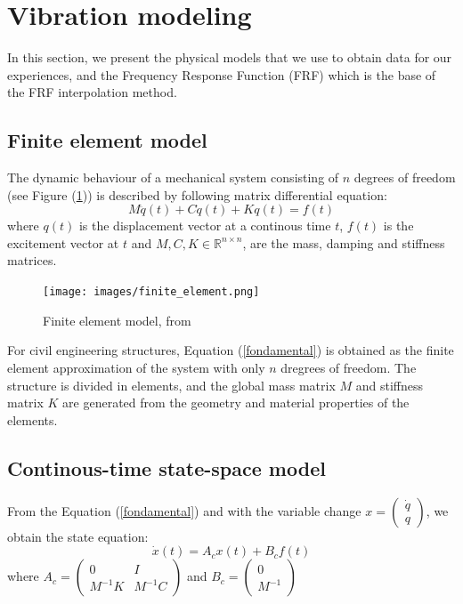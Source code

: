 \documentclass[journal]{IEEEtran}
\begin{document}
\section{Vibration modeling}

In this section, we present the physical models that we use to obtain data for our experiences, and the Frequency Response Function (FRF) which is the base of the FRF interpolation method.

\subsection{Finite element model}

The dynamic behaviour of a mechanical system consisting of $n$ degrees of freedom (see Figure (\ref{finite_el})) is described by following matrix differential equation:
\begin{equation}
M \ddot{q}(t) + C \dot{q}(t) + K q(t) = f(t)
\label{fondamental}
\end{equation}
where $q(t)$ is the displacement vector at a continous time $t$, $f(t)$ is the excitement vector at $t$ and $M, C, K \in \mathbb{R}^{n \times n}$, are the mass, damping and stiffness matrices.


\begin{figure}[h!]
  \centering
  \texttt{[image: images/finite\_element.png]}
  \caption{Finite element model, from \cite{peeters2000system}}
  \label{finite_el}
\end{figure}

For civil engineering structures, Equation (\ref{fondamental}) is obtained as the finite element approximation of the system with only $n$ dregrees of freedom.
The structure is divided in elements, and the global mass matrix $M$ and stiffness matrix $K$ are generated from the geometry and material
properties of the elements.

\subsection{Continous-time state-space model} %

From the Equation (\ref{fondamental}) and with the variable change $x =
\begin{pmatrix}
\dot{q} \\
q
\end{pmatrix}$, we obtain the state equation:
\begin{equation}
\dot{x}(t) = A_cx(t) + B_cf(t)
\end{equation}
 where
$A_c =
\begin{pmatrix}
0 & I \\
M^{-1}K & M^{-1}C
\end{pmatrix}$
and
$B_c=
\begin{pmatrix}
0 \\
M^{-1}
\end{pmatrix}$
\end{document}
